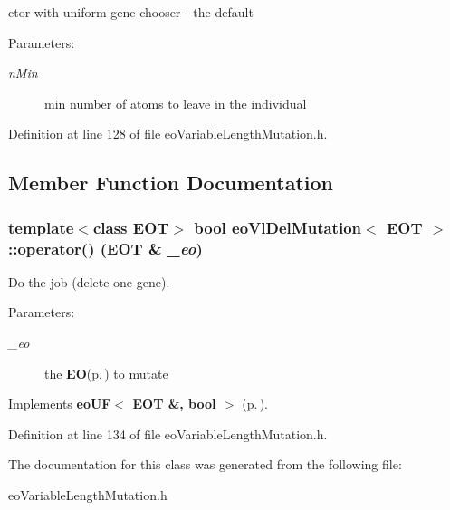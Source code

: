 ctor with uniform gene chooser - the default 

\begin{Desc}
\item[Parameters:]
\begin{description}
\item[{\em n\-Min}]min number of atoms to leave in the individual \end{description}
\end{Desc}


Definition at line 128 of file eo\-Variable\-Length\-Mutation.h.

\subsection{Member Function Documentation}
\subsubsection{\setlength{\rightskip}{0pt plus 5cm}template$<$class EOT$>$ bool {\bf eo\-Vl\-Del\-Mutation}$<$ {\bf EOT} $>$::operator() ({\bf EOT} \& {\em \_\-eo})\hspace{0.3cm}{\tt  [inline, virtual]}}\label{classeo_vl_del_mutation_a2}


Do the job (delete one gene). 

\begin{Desc}
\item[Parameters:]
\begin{description}
\item[{\em \_\-eo}]the {\bf EO}{\rm (p.\,\pageref{class_e_o})} to mutate \end{description}
\end{Desc}


Implements {\bf eo\-UF$<$ EOT \&, bool $>$} {\rm (p.\,\pageref{classeo_u_f_a1})}.

Definition at line 134 of file eo\-Variable\-Length\-Mutation.h.

The documentation for this class was generated from the following file:\begin{CompactItemize}
\item 
eo\-Variable\-Length\-Mutation.h\end{CompactItemize}
